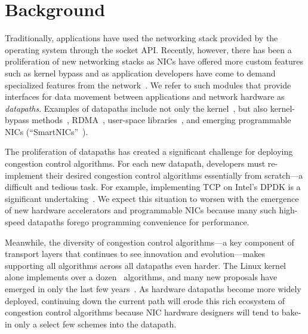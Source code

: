\section{Background}%
\label{sec:intro}

Traditionally, applications have used the networking stack provided by the operating system through the socket API\@.  Recently, however, there has been a proliferation of new networking stacks as NICs have offered more custom features such as kernel bypass and as application developers have come to demand specialized features from the network~\cite{dpdk, mtcp, netmap, dcqcn, ix, quic}.  We refer to such modules that provide interfaces for data movement between applications and network hardware as \emph{datapaths}. 
Examples of datapaths include not only the kernel~\cite{lwn-pluggable-tcp}, but also kernel-bypass methods~\cite{dpdk, netmap, mtcp}, RDMA~\cite{dcqcn}, user-space libraries~\cite{quic}, and emerging programmable NICs (``SmartNICs''~\cite{smartnic}).

The proliferation of datapaths has created a significant challenge for deploying congestion control algorithms. For each new datapath, developers must re-implement their desired congestion control algorithms essentially from scratch---a difficult and tedious task. 
For example, implementing TCP on Intel's DPDK is a significant undertaking~\cite{mtcp}. We expect this situation to worsen with the emergence of new hardware accelerators and programmable NICs because many such high-speed datapaths forego programming convenience for performance.

Meanwhile, the diversity of congestion control algorithms---a key component of transport layers that continues to see innovation and evolution---makes supporting all algorithms across all datapaths even harder. The Linux kernel alone implements over a dozen~\cite{Jacobson88,newreno,cubic,vegas,illinois,htcp} algorithms, and many new proposals have emerged in only the last few years~\cite{dctcp,sprout,remy,pcc,rc3,gentleaggression,timely,bbr,dccp}. 
As hardware datapaths become more widely deployed, continuing down the current path will erode this rich ecosystem of congestion control algorithms because NIC hardware designers will tend to bake-in only a select few schemes into the datapath.

